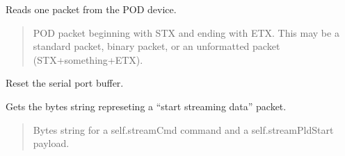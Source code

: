 \documentclass[letterpaper,10pt,english]{sphinxmanual}
\begin{document}
\begin{fulllineitems}
\begin{fulllineitems}
\end{fulllineitems}


\begin{fulllineitems}
\label{\detokenize{PodApi.Stream:PodApi.Stream.DeviceValve.Valve.Drip}}
\pysigstartsignatures
{}
\pysigstopsignatures
\sphinxAtStartPar
Reads one packet from the POD device.
\begin{quote}\begin{description}
\sphinxAtStartPar
POD packet beginning with STX and ending with ETX.                 This may be a standard packet, binary packet, or an                 unformatted packet (STX+something+ETX).

\sphinxAtStartPar
{\hyperref[\detokenize{PodApi.Packets:PodApi.Packets.Packet.Packet}]{}}

\end{description}\end{quote}

\end{fulllineitems}


\begin{fulllineitems}
\label{\detokenize{PodApi.Stream:PodApi.Stream.DeviceValve.Valve.EmptyValve}}
\pysigstartsignatures
{}
\pysigstopsignatures
\sphinxAtStartPar
Reset the serial port buffer.

\end{fulllineitems}


\begin{fulllineitems}
\label{\detokenize{PodApi.Stream:PodApi.Stream.DeviceValve.Valve.GetStartBytes}}
\pysigstartsignatures
{}
\pysigstopsignatures
\sphinxAtStartPar
Gets the bytes string represeting a “start streaming data” packet.
\begin{quote}\begin{description}
\sphinxAtStartPar
Bytes string for a self.streamCmd command and a                 self.streamPldStart payload.


\end{description}
\end{quote}
\end{fulllineitems}
\end{fulllineitems}
\end{document}
